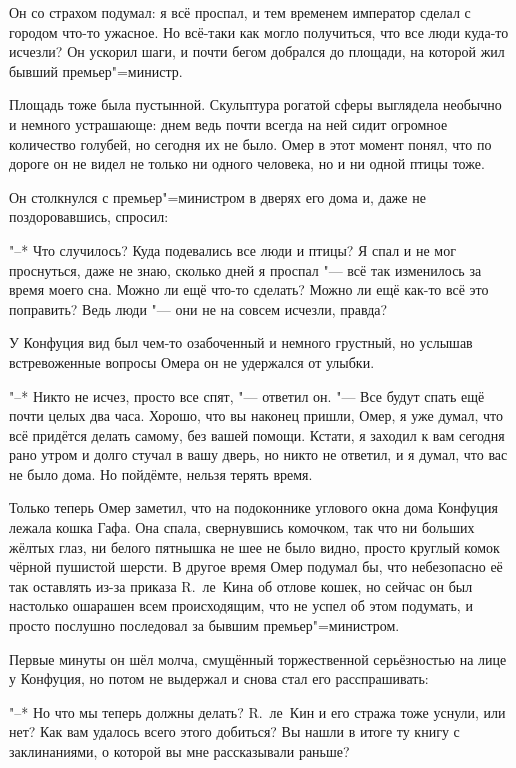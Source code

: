 Он со страхом подумал: я всё проспал, и тем временем император сделал с городом
что-то ужасное.
Но всё-таки как могло получиться, что все люди куда-то исчезли?
Он ускорил шаги, и почти бегом добрался до площади, на которой жил бывший
премьер"=министр.

Площадь тоже была пустынной.
Скульптура рогатой сферы выглядела необычно и немного устрашающе: днем ведь
почти всегда на ней сидит огромное количество голубей, но сегодня их не было.
Омер в этот момент понял, что по дороге он не видел не только ни одного человека,
но и ни одной птицы тоже.

Он столкнулся с премьер"=министром в дверях его дома и, даже не поздоровавшись,
спросил:

"--* Что случилось?
Куда подевались все люди и птицы?
Я спал и не мог проснуться, даже не знаю, сколько дней я проспал "--- всё так
изменилось за время моего сна.
Можно ли ещё что-то сделать?
Можно ли ещё как-то всё это поправить?
Ведь люди "--- они не на совсем исчезли, правда?

У Конфуция вид был чем-то озабоченный и немного грустный, но услышав
встревоженные вопросы Омера он не удержался от улыбки.

"--* Никто не исчез, просто все спят, "--- ответил он.
"--- Все будут спать ещё почти целых два часа.
Хорошо, что вы наконец пришли, Омер, я уже думал, что всё придётся делать
самому, без вашей помощи.
Кстати, я заходил к вам сегодня рано утром и долго стучал в вашу дверь, но никто
не ответил, и я думал, что вас не было дома.
Но пойдёмте, нельзя терять время.

Только теперь Омер заметил, что на подоконнике углового окна дома Конфуция
лежала кошка Гафа.
Она спала, свернувшись комочком, так что ни больших жёлтых глаз, ни белого
пятнышка не шее не было видно, просто круглый комок чёрной пушистой шерсти.
В другое время Омер подумал бы, что небезопасно её так оставлять из-за приказа
R.~ле~Кина об отлове кошек, но сейчас он был настолько ошарашен всем
происходящим, что не успел об этом подумать, и просто послушно последовал за
бывшим премьер"=министром.

Первые минуты он шёл молча, смущённый торжественной серьёзностью на лице у
Конфуция, но потом не выдержал и снова стал его расспрашивать:

"--* Но что мы теперь должны делать?
R.~ле~Кин и его стража тоже уснули, или нет?
Как вам удалось всего этого добиться?
Вы нашли в итоге ту книгу с заклинаниями, о которой вы мне рассказывали раньше?

